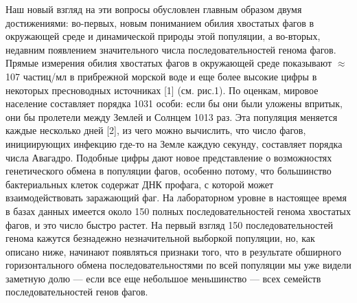 \documentclass[a4paper,12pt]{article}
\begin{document}
    \par{Наш новый взгляд на эти вопросы обусловлен главным образом двумя достижениями: во-первых, новым пониманием
    обилия хвостатых фагов в окружающей среде и динамической природы этой популяции, а во-вторых, недавним появлением
    значительного числа последовательностей генома фагов. Прямые измерения обилия хвостатых фагов в окружающей среде
    показывают $\approx$107 частиц/мл в прибрежной морской воде и еще более высокие цифры в некоторых пресноводных источниках
    [1] (см. рис.1). По оценкам, мировое население составляет порядка 1031 особи: если бы они были уложены впритык, они
    бы пролетели между Землей и Солнцем 1013 раз. Эта популяция меняется каждые несколько дней [2], из чего можно
    вычислить, что число фагов, инициирующих инфекцию где-то на Земле каждую секунду, составляет порядка числа Авагадро.
    Подобные цифры дают новое представление о возможностях генетического обмена в популяции фагов, особенно потому, что
    большинство бактериальных клеток содержат ДНК профага, с которой может взаимодействовать заражающий фаг. На
    лабораторном уровне в настоящее время в базах данных имеется около 150 полных последовательностей генома хвостатых
    фагов, и это число быстро растет. На первый взгляд 150 последовательностей генома кажутся безнадежно незначительной
    выборкой популяции, но, как описано ниже, начинают появляться признаки того, что в результате обширного
    горизонтального обмена последовательностями по всей популяции мы уже видели заметную долю — если все еще небольшое
    меньшинство — всех семейств последовательностей генов фагов.}
    
\end{document}
